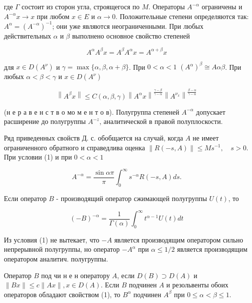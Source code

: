 \documentclass[10pt]{article}
\begin{document}
где $\Gamma$ состоит из сторон угла, строящегося по $M$. Операторы $A^{-\alpha}$ ограничены и $A^{-\alpha} x \rightarrow x$ при любом $x \in E$ и $\alpha \rightarrow 0$. Положительные степени определяются так: $A^{\alpha}=\left(A^{-\alpha}\right)^{-1}$; они уже являются неограниченными. При любых действительных $\alpha$ и $\beta$ выполнено основное свойство степеней



\[

A^{\alpha} A^{\beta} x=A^{\beta} A^{\alpha} x=A^{\alpha+\beta} x

\]



для $x \in D\left(A^{\nu}\right)$ и $\gamma=\max \{\alpha, \beta, \alpha+\beta\}$. При $0<\alpha<1$ $\left(A^{\alpha}\right)^{\beta} \cong A \alpha \beta$. При любых $\alpha<\beta<\gamma$ и $x \in D\left(A^{\nu}\right)$



\[

\left\|A^{\beta} x\right\| \leqslant C(\alpha, \beta, \gamma)\left\|A^{\alpha} x\right\|^{\frac{\gamma-\beta}{\gamma-\alpha}}\left\|A^{\nu_{x}}\right\|^{\frac{\beta-\alpha}{\gamma-\alpha}}

\]



(н е р а в е н с т в о мо м е н т о в). Полугруппа степеней $A^{-\alpha}$ допускает расширение до полугруппы $A^{-z}$, аналитической в правой полуплоскости.



Ряд приведенных свойств Д. с. обобщается на случай, когда $A$ не имеет ограниченного обратного и справедлива оценка $\|R(-s, A)\| \leqslant M s^{-1}, \quad s>0$. При условии (1) и при $0<\alpha<1$



\[

A^{-\alpha}=\frac{\sin \alpha \pi}{\pi} \int_{0}^{\infty} s^{-\alpha} R(-s, A) d s .

\]



Если оператор $B$ - производящий оператор сжимающей полугруппы $U(t)$, то



\[

(-B)^{-\alpha}=\frac{1}{\Gamma(\alpha)} \int_{0}^{\infty} t^{\alpha-1} U(t) d t

\]



Из условия (1) не вытекает, что $-A$ является производящим оператором сильно непрерывной полугруппы, но оператор $-A^{\alpha}$ при $\alpha \leqslant 1 / 2$ является производящим оператором аналитич. полугруппы.



Оператор $B$ под чи н е н оператору $A$, если $D(B) \supset D(A)$ и $\|B x\| \leqslant c\|A x\|, x \in D(A)$. Если $B$ подчинен $A$ и резольвенты обоих операторов обладают свойством (1), то $B^{\alpha}$ подчинен $A^{\beta}$ при $0 \leqslant \alpha<\beta \leqslant 1$.
\end{document}
